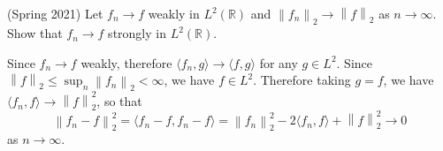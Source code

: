 \documentclass[answers]{exam}
\theoremstyle{problemstyle}
\newcommand{\norm}[1]{\left\lVert#1\right\rVert} %
\newcommand{\1}[1]{\textbf{1}_{\left[#1\right]}} %
\def\R{\mathbb{R}} %
\begin{document}
\begin{questions}
\question (Spring 2021) Let $f_n \to f$ weakly in $L^2(\R)$ and $\norm{f_n}_2 \to \norm{f}_2$ as $n\to\infty$. Show that $f_n\to f$ strongly in $L^2(\R)$.

\begin{solution}
Since $f_n\to f$ weakly, therefore $\langle f_n, g \rangle \to \langle f, g \rangle$ for any $g\in L^2$. Since $\norm{f}_2 \leq \sup_{n}\norm{f_n}_2 <\infty$, we have $f\in L^2$. Therefore taking $g=f$, we have $\langle f_n,f\rangle \to \norm{f}_2^2$, so that
\begin{equation*}
\norm{f_n-f}_2^2 = \langle f_n-f,f_n-f\rangle = \norm{f_n}_2^2 -2 \langle f_n,f\rangle + \norm{f}^2_2 \to 0
\end{equation*}
as $n\to \infty$.
\end{solution}









\end{questions}
\end{document}
